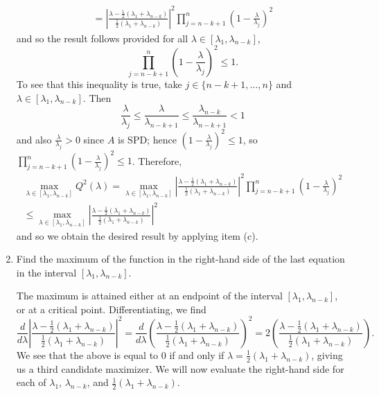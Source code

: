 \documentclass{../../../kin_math}
\begin{document}
\begin{questions}
\begin{enumerate}
\begin{solution}
\begin{multline*}
        = \left|\frac{\lambda - \frac{1}{2}(\lambda_1 + \lambda_{n - k})}{\frac{1}{2}(\lambda_1 + \lambda_{n - k})}\right|^2 \prod_{j = n - k + 1}^n \left(1 - \frac{\lambda}{\lambda_j}\right)^2
      \end{multline*}
      and so the result follows provided for all $\lambda \in [\lambda_1, \lambda_{n - k}]$,
      \begin{equation*}
        \prod_{j = n - k + 1}^n \left(1 - \frac{\lambda}{\lambda_j}\right)^2 \leq 1.
      \end{equation*}
      To see that this inequality is true, take $j \in \{n - k + 1, \dots, n\}$ and $\lambda \in [\lambda_1, \lambda_{n - k}]$. Then
      \begin{equation*}
        \frac{\lambda}{\lambda_j} \leq \frac{\lambda}{\lambda_{n - k + 1}} \leq \frac{\lambda_{n - k}}{\lambda_{n - k + 1}} < 1
      \end{equation*}
      and also $\frac{\lambda}{\lambda_j} > 0$ since $A$ is SPD; hence $\left(1 - \frac{\lambda}{\lambda_j}\right)^2 \leq 1$, so $\prod_{j = n - k + 1}^n \left(1 - \frac{\lambda}{\lambda_j}\right)^2 \leq 1$. Therefore,
      \begin{multline*}
        \max_{\lambda \in [\lambda_1, \lambda_{n - k}]} Q^2(\lambda) = \max_{\lambda \in [\lambda_1, \lambda_{n - k}]} \left|\frac{\lambda - \frac{1}{2}(\lambda_1 + \lambda_{n - k})}{\frac{1}{2}(\lambda_1 + \lambda_{n - k})}\right|^2 \prod_{j = n - k + 1}^n \left(1 - \frac{\lambda}{\lambda_j}\right)^2 \\
        \leq \max_{\lambda \in [\lambda_1, \lambda_{n - k}]} \left| \frac{\lambda - \frac{1}{2}(\lambda_1 + \lambda_{n - k})}{\frac{1}{2}(\lambda_1 + \lambda_{n - k})} \right|^2
      \end{multline*}
      and so we obtain the desired result by applying item (c).
    \end{solution}
    \item Find the maximum of the function in the right-hand side of the last equation in the interval $[\lambda_1, \lambda_{n - k}]$.
    \begin{solution}
      The maximum is attained either at an endpoint of the interval $[\lambda_1, \lambda_{n - k}]$, or at a critical point. Differentiating, we find
      \begin{equation*}
        \frac{d}{d\lambda} \left| \frac{\lambda - \frac{1}{2}(\lambda_1 + \lambda_{n - k})}{\frac{1}{2}(\lambda_1 + \lambda_{n - k})} \right|^2 = \frac{d}{d\lambda} \left( \frac{\lambda - \frac{1}{2}(\lambda_1 + \lambda_{n - k})}{\frac{1}{2}(\lambda_1 + \lambda_{n - k})} \right)^2 = 2 \left( \frac{\lambda - \frac{1}{2}(\lambda_1 + \lambda_{n - k})}{\frac{1}{2}(\lambda_1 + \lambda_{n - k})} \right).
      \end{equation*}
      We see that the above is equal to 0 if and only if $\lambda = \frac{1}{2}(\lambda_1 + \lambda_{n - k})$, giving us a third candidate maximizer. We will now evaluate the right-hand side for each of $\lambda_1$, $\lambda_{n - k}$, and $\frac{1}{2}(\lambda_1 + \lambda_{n - k})$.


\end{solution}
\end{enumerate}
\end{questions}
\end{document}

